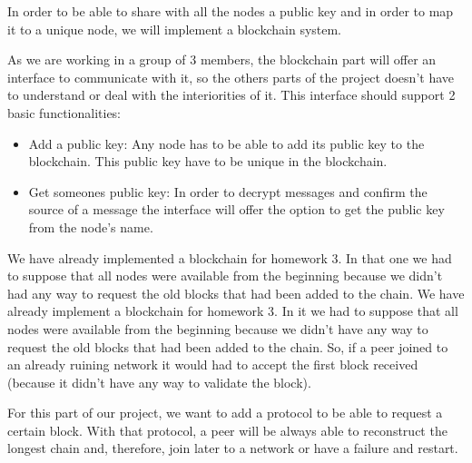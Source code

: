 \documentclass[12pt,a4paper,draft]{article}
\begin{document}
In order to be able to share with all the nodes a public key and in order to map it to a unique node, we will implement a blockchain system.

As we are working in a group of 3 members, the blockchain part will offer an interface to communicate with it, so the others parts of the project doesn't have to understand or deal with the interiorities of it. This interface should support 2 basic functionalities:

\begin{itemize}
 \item Add a public key: Any node has to be able to add its public key to the blockchain. This public key have to be unique in the blockchain.
 \item Get someones public key: In order to decrypt messages and confirm the source of a message the interface will offer the option to get the public key from the node's name.
\end{itemize}

We have already implemented a blockchain for homework 3. In that one we had to suppose that all nodes were available from the beginning because we didn't had any way to request the old blocks that had been added to the chain.
We have already implement a blockchain for homework 3.
In it we had to suppose that all nodes were available from the beginning because we didn't have any way to request the old blocks that had been added to the chain.
So, if a peer joined to an already ruining network it would had to accept the first block received (because it didn't have any way to validate the block).

For this part of our project, we want to add a protocol to be able to request a certain block. With that protocol, a peer will be always able to reconstruct the longest chain and, therefore, join later to a network or have a failure and restart.
\end{document}
